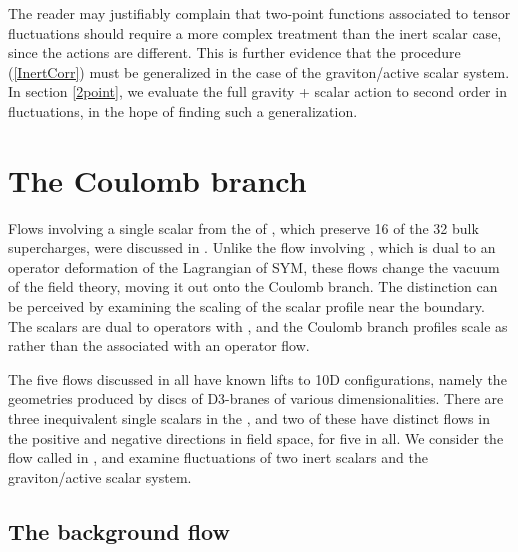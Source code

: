 \documentclass[a4paper,12pt]{article}
\begin{document}
The reader may justifiably complain that two-point functions
associated to tensor fluctuations should require a more complex
treatment than the inert scalar case, since the actions
are different.  This is further evidence that the procedure
(\ref{InertCorr}) must be generalized in the case of the
graviton/active scalar system.  In section \ref{2point}, we evaluate
the full gravity + scalar action to second order in fluctuations, in
the hope of finding such a generalization.

\section{The Coulomb branch}
\label{coulomb}

Flows involving a single scalar from the \coordHE{} of \coordHE{},
which preserve 16 of the 32 bulk supercharges, were
discussed in \cite{fgpw2,bs}.  
Unlike the flow involving \coordHE{}, which
is dual to an operator deformation of the Lagrangian of \coordHE{}
SYM, these flows change the vacuum of the field theory, moving it out
onto the Coulomb branch.  The distinction can be perceived by
examining the scaling of the scalar profile near the boundary.  The
\coordHE{} scalars are dual to operators with \coordHE{}, and the
Coulomb branch profiles scale as \coordHE{} rather than the \coordHE{}
associated with an operator flow.

The five flows discussed in \cite{fgpw2} all have known lifts to 10D
configurations, namely the geometries produced by discs of D3-branes
of various dimensionalities.  There are three inequivalent single
scalars in the \coordHE{}, and two of these have distinct flows in
the positive and negative directions in field space, for five in all.
We consider the flow called \coordHE{} in \cite{fgpw2}, and examine
fluctuations of two inert scalars and the graviton/active scalar
system.

\subsection{The background flow}
\end{document}
